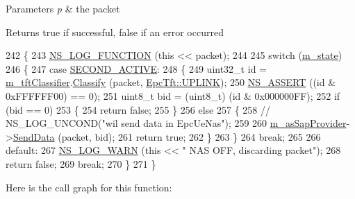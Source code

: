 \begin{DoxyParams}{Parameters}
{\em p} & the packet\\
\hline
\end{DoxyParams}
\begin{DoxyReturn}{Returns}
true if successful, false if an error occurred 
\end{DoxyReturn}

\begin{DoxyCode}
242 \{
243   \hyperlink{log-macros-disabled_8h_a90b90d5bad1f39cb1b64923ea94c0761}{NS\_LOG\_FUNCTION} (\textcolor{keyword}{this} << packet);
244 
245   \textcolor{keywordflow}{switch} (\hyperlink{classns3_1_1EpcUeNas_a1717ecab2177c959111e14fdad7972d0}{m\_state})
246     \{
247     \textcolor{keywordflow}{case} \hyperlink{classns3_1_1EpcUeNas_a8047255fecfac11c9e1abe6f13d527dca030e2ae6d3c62c94c68fadd74bf5bf95}{SECOND\_ACTIVE}:
248       \{
249         uint32\_t \textcolor{keywordtype}{id} = \hyperlink{classns3_1_1EpcUeNas_aad557b717272071b34807e2af0bd9364}{m\_tftClassifier}.\hyperlink{classns3_1_1EpcTftClassifier_a5db19944027854e4f6f1c7f2ec2ef336}{Classify} (packet, 
      \hyperlink{classns3_1_1EpcTft_a6037510585658e017a8011862ce56946a5327d0aa05b24c5033cf3ae0f5156a26}{EpcTft::UPLINK});
250         \hyperlink{assert_8h_a6dccdb0de9b252f60088ce281c49d052}{NS\_ASSERT} ((\textcolor{keywordtype}{id} & 0xFFFFFF00) == 0);
251         uint8\_t bid = (uint8\_t) (\textcolor{keywordtype}{id} & 0x000000FF);
252         \textcolor{keywordflow}{if} (bid == 0)
253           \{
254             \textcolor{keywordflow}{return} \textcolor{keyword}{false};
255           \}
256         \textcolor{keywordflow}{else}
257           \{
258                 \textcolor{comment}{// NS\_LOG\_UNCOND("wil send data in EpcUeNas");}
259 
260                 \hyperlink{classns3_1_1EpcUeNas_a989e75be6c48906d2b2deb55147a10fd}{m\_asSapProvider}->\hyperlink{classns3_1_1LteAsSapProvider_a8480ab246d64feb077090923c62fa712}{SendData} (packet, bid);
261             \textcolor{keywordflow}{return} \textcolor{keyword}{true};
262           \}
263       \}
264       \textcolor{keywordflow}{break};
265 
266     \textcolor{keywordflow}{default}:
267       \hyperlink{group__logging_gade7208b4009cdf0e25783cd26766f559}{NS\_LOG\_WARN} (\textcolor{keyword}{this} << \textcolor{stringliteral}{" NAS OFF, discarding packet"});
268       \textcolor{keywordflow}{return} \textcolor{keyword}{false};
269       \textcolor{keywordflow}{break};
270     \}
271 \}
\end{DoxyCode}


Here is the call graph for this function\+:


